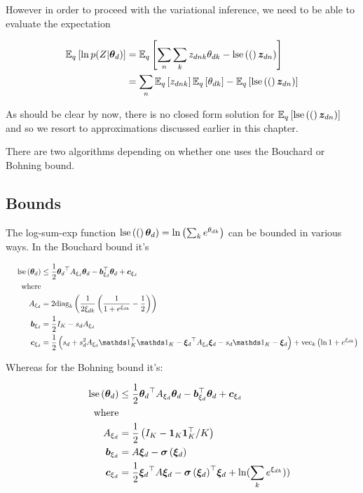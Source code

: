 However in order to proceed with the variational inference, we need to be able to evaluate the expectation

\begin{align}
\ex{\ln p(Z|\thd)}{q} 
&= \ex{\sum_n \sum_k \zdnk \thdk - \lse(\zdn)}{q} \\
&= \sum_n \ex{\zdnk}{q}\ex{\thdk}{q} - \ex{\lse(\zdn)}{q}
\end{align}

As should be clear by now, there is no closed form solution for $\ex{\lse(\zdn)}{q}$ and so we resort to approximations discussed earlier in this chapter.

There are two algorithms depending on whether one uses the Bouchard\cite{Bouchard2007} or Bohning\cite{Bohning1988} bound.

\subsection{Bounds}

\newcommand \Axi { A_{\xi_d} }
\newcommand \bxi { \vv{b}_{\xi_d} }
\newcommand \cxi { \vv{c}_{\xi_d} }
\newcommand \lse[1] { \text{lse}\left(#1\right) }
\newcommand \onek { \one_K }
\newcommand \isigma {\Sigma^{-1}}
\newcommand \Vd { V^{(d)} }
\newcommand \zdvk { { z_{dvk} } }
\newcommand \wdv { { w_{dv} } }


The log-sum-exp function $\lse(\thd) = \ln\left(\sum_k e^{\thdk}\right)$ can be bounded in various ways. In the Bouchard bound\cite{Bouchard2007} it's

\begin{align}
\lse{\thd} & \leq \half \thd\T \Axi \thd - \bxi\T\thd + \cxi \\
\qquad \text{where} \\
\Axi & = 2 \text{diag}_k
    \left(
        \frac{1}{2\Edk}\left(\frac{1}{1 + e^{\Edk}} - \half\right)
    \right) \\
\bxi & = \half I_K - s_d \Axi \\
\cxi & = \half \left( s_d + s_d^2 \Axi \onek\T\onek - \Ed\T\Axi\Ed -  s_d \onek - \Ed\right) + \text{vec}_k\left({\ln 1+e^{\Edk}}\right)
\end{align} 

Whereas for the Bohning bound it's:

\begin{align}
\lse{\thd} & \leq \half \thd\T \Axi \thd - \bxi\T\thd + \cxi \\
\qquad \text{where} \\
\Axi & = \half \left(I_K - \mathbf{1}_K\mathbf{1}_K\T / K  \right) \\
\bxi & = A \Ed  - \sigmoid{\Ed} \\
\cxi & = \half \Ed\T A \Ed - \sigmoid{\Ed}\T\Ed + \ln(\sum_k e^{\Edk}))
\end{align} 

